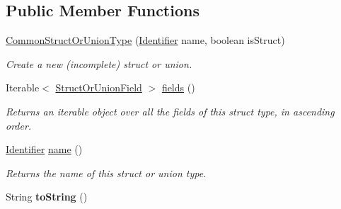 \subsection*{Public Member Functions}
\begin{DoxyCompactItemize}
\item 
\hyperlink{classedu_1_1udel_1_1cis_1_1vsl_1_1civl_1_1model_1_1common_1_1type_1_1CommonStructOrUnionType_adb6b89296baba63864d736c7cb405ec3}{Common\+Struct\+Or\+Union\+Type} (\hyperlink{interfaceedu_1_1udel_1_1cis_1_1vsl_1_1civl_1_1model_1_1IF_1_1Identifier}{Identifier} name, boolean is\+Struct)
\begin{DoxyCompactList}\small\item\em Create a new (incomplete) struct or union. \end{DoxyCompactList}\item 
Iterable$<$ \hyperlink{interfaceedu_1_1udel_1_1cis_1_1vsl_1_1civl_1_1model_1_1IF_1_1type_1_1StructOrUnionField}{Struct\+Or\+Union\+Field} $>$ \hyperlink{classedu_1_1udel_1_1cis_1_1vsl_1_1civl_1_1model_1_1common_1_1type_1_1CommonStructOrUnionType_aa9a0fafc21cd6289a0fba94762e692d5}{fields} ()
\begin{DoxyCompactList}\small\item\em Returns an iterable object over all the fields of this struct type, in ascending order. \end{DoxyCompactList}\item 
\hyperlink{interfaceedu_1_1udel_1_1cis_1_1vsl_1_1civl_1_1model_1_1IF_1_1Identifier}{Identifier} \hyperlink{classedu_1_1udel_1_1cis_1_1vsl_1_1civl_1_1model_1_1common_1_1type_1_1CommonStructOrUnionType_ade0c0ae79083a2dc08ac34dd4f3945a0}{name} ()
\begin{DoxyCompactList}\small\item\em Returns the name of this struct or union type. \end{DoxyCompactList}\item 
\hypertarget{classedu_1_1udel_1_1cis_1_1vsl_1_1civl_1_1model_1_1common_1_1type_1_1CommonStructOrUnionType_a3b83025c6f899a6677ef6a4cf81d6355}{}String {\bfseries to\+String} ()\label{classedu_1_1udel_1_1cis_1_1vsl_1_1civl_1_1model_1_1common_1_1type_1_1CommonStructOrUnionType_a3b83025c6f899a6677ef6a4cf81d6355}


\end{DoxyCompactItemize}
